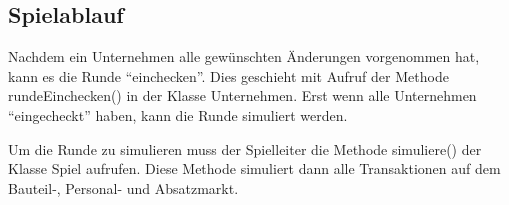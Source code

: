 \subsection{Spielablauf}
\label{sub:fachkonzept-implementierung-spielablauf}

Nachdem ein Unternehmen alle gewünschten Änderungen vorgenommen hat, kann es die Runde “einchecken”. Dies geschieht
mit Aufruf der Methode rundeEinchecken() in der Klasse Unternehmen. Erst wenn alle Unternehmen “eingecheckt” haben,
kann die Runde simuliert werden.

Um die Runde zu simulieren muss der Spielleiter die Methode simuliere() der Klasse Spiel aufrufen. Diese Methode
simuliert dann alle Transaktionen auf dem Bauteil-, Personal- und Absatzmarkt.

\autorende